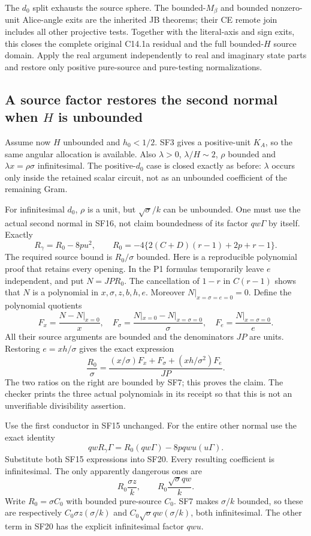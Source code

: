 The $d_0$ split exhausts the source sphere. The bounded-$M_\beta$
and bounded nonzero-unit Alice-angle exits are the inherited JB
theorems; their CE remote join includes all other projective tests.
Together with the literal-axis and sign exits, this closes the
complete original C14.1a residual and the full bounded-$H$ source
domain. Apply the real argument independently to real and imaginary
state parts and restore only positive pure-source and pure-testing
normalizations.

\subsection{A source factor restores the second normal when $H$ is unbounded}

Assume now $H$ unbounded and $h_0<1/2$. SF3 gives a positive-unit
$K_A$, so the same angular allocation is available. Also
$\lambda>0$, $\lambda/H\sim2$, $\rho$ bounded and
$\lambda x=\rho\sigma$ infinitesimal. The positive-$d_0$ case is
closed exactly as before: $\lambda$ occurs only inside the retained
scalar circuit, not as an unbounded coefficient of the remaining Gram.

For infinitesimal $d_0$, $\rho$ is a unit, but $\sqrt\sigma/k$
can be unbounded. One must use the actual second normal in SF16,
not claim boundedness of its factor $qw\Gamma$ by itself. Exactly
\[
 R_\gamma=R_0-8pu^2,\qquad
 R_0=-4\{2(C+D)(r-1)+2p+r-1\}.
 \tag{SF18}
\]
The required source bound is $R_0/\sigma$ bounded. Here is a
reproducible polynomial proof that retains every opening. In the
P1 formulas temporarily leave $e$ independent, and put
$N=JP R_0$. The cancellation of $1-r$ in $C(r-1)$ shows that $N$
is a polynomial in $x,\sigma,z,b,h,e$. Moreover
$N|_{x=\sigma=e=0}=0$. Define the polynomial quotients
\[
 F_x=\frac{N-N|_{x=0}}x,\quad
 F_\sigma=\frac{N|_{x=0}-N|_{x=\sigma=0}}\sigma,\quad
 F_e=\frac{N|_{x=\sigma=0}}e.
\]
All their source arguments are bounded and the denominators $JP$
are units. Restoring $e=xh/\sigma$ gives the exact expression
\[
 \frac{R_0}{\sigma}
 =\frac{(x/\sigma)F_x+F_\sigma+(xh/\sigma^2)F_e}{JP}.
 \tag{SF19}
\]
The two ratios on the right are bounded by SF7; this proves the
claim. The checker prints the three actual polynomials in its receipt
so that this is not an unverifiable divisibility assertion.

Use the first conductor in SF15 unchanged. For the entire other
normal use the exact identity
\[
 qwR_\gamma\Gamma=R_0(qw\Gamma)-8p qwu(u\Gamma).
 \tag{SF20}
\]
Substitute both SF15 expressions into SF20. Every resulting
coefficient is infinitesimal. The only apparently dangerous ones are
\[
 R_0\frac{\sigma z}{k},\qquad
 R_0\frac{\sqrt\sigma qw}{k}.
\]
Write $R_0=\sigma C_0$ with bounded pure-source $C_0$. SF7 makes
$\sigma/k$ bounded, so these are respectively
$C_0\sigma z(\sigma/k)$ and
$C_0\sqrt\sigma qw(\sigma/k)$, both infinitesimal. The other
term in SF20 has the explicit infinitesimal factor $qwu$.

